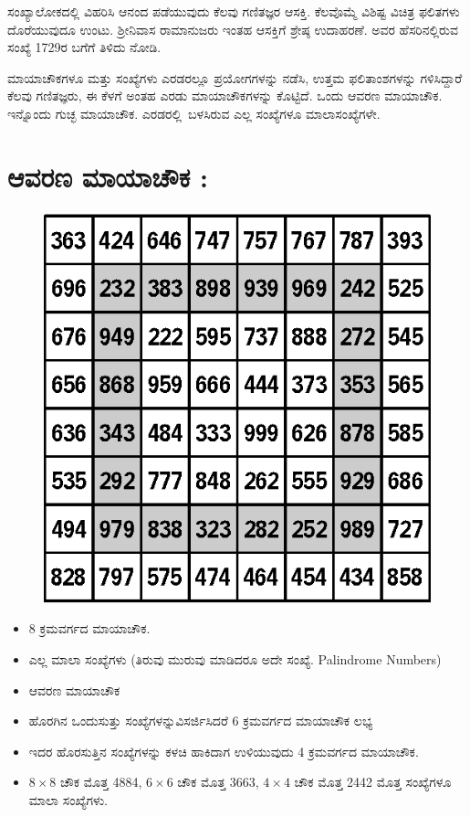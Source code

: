 ಸಂಖ್ಯಾಲೋಕದಲ್ಲಿ ವಿಹರಿಸಿ ಆನಂದ ಪಡೆಯುವುದು ಕೆಲವು ಗಣಿತಜ್ಞರ ಆಸಕ್ತಿ. ಕೆಲವೊಮ್ಮೆ ವಿಶಿಷ್ಟ ವಿಚಿತ್ರ ಫಲಿತಗಳು ದೊರೆಯುವುದೂ ಉಂಟು. ಶ್ರೀನಿವಾಸ ರಾಮಾನುಜರು ಇಂತಹ ಆಸಕ್ತಿಗೆ ಶ್ರೇಷ್ಠ ಉದಾಹರಣೆ. ಅವರ ಹೆಸರಿನಲ್ಲಿರುವ ಸಂಖ್ಯೆ 1729ರ ಬಗೆಗೆ ತಿಳಿದು ನೋಡಿ.

ಮಾಯಾಚೌಕಗಳೂ ಮತ್ತು ಸಂಖ್ಯೆಗಳು ಎರಡರಲ್ಲೂ ಪ್ರಯೋಗಗಳನ್ನು ನಡೆಸಿ, ಉತ್ತಮ ಫಲಿತಾಂಶಗಳನ್ನು ಗಳಿಸಿದ್ದಾರೆ ಕೆಲವು ಗಣಿತಜ್ಞರು, ಈ ಕೆಳಗೆ ಅಂತಹ ಎರಡು ಮಾಯಾಚೌಕ\-ಗಳನ್ನು ಕೊಟ್ಟಿದೆ. ಒಂದು ಆವರಣ ಮಾಯಾಚೌಕ. ಇನ್ನೊಂದು ಗುಚ್ಛ ಮಾಯಾಚೌಕ. \hbox{ಎರಡರಲ್ಲಿ ಬಳಸಿರುವ} ಎಲ್ಲ ಸಂಖ್ಯೆಗಳೂ ಮಾಲಾಸಂಖ್ಯೆಗಳೇ.

\section*{ಆವರಣ ಮಾಯಾಚೌಕ :}

\begin{figure}[H]
\includegraphics{src/figures/chap5/fig5-14.eps}
\end{figure}

\begin{itemize}
	\item 8 ಕ್ರಮವರ್ಗದ ಮಾಯಾಚೌಕ.
	\item ಎಲ್ಲ ಮಾಲಾ ಸಂಖ್ಯೆಗಳು (ತಿರುವು ಮುರುವು ಮಾಡಿದರೂ ಅದೇ ಸಂಖ್ಯೆ. Palindrome Numbers)
	\item ಆವರಣ ಮಾಯಾಚೌಕ
	\item ಹೊರಗಿನ ಒಂದುಸುತ್ತು ಸಂಖ್ಯೆಗಳನ್ನುವಿಸರ್ಜಿಸಿದರೆ 6 ಕ್ರಮವರ್ಗದ ಮಾಯಾಚೌಕ ಲಭ್ಯ
	\item ಇದರ ಹೊರಸುತ್ತಿನ ಸಂಖ್ಯೆಗಳನ್ನು ಕಳಚಿ ಹಾಕಿದಾಗ ಉಳಿಯುವುದು 4 ಕ್ರಮ\-ವರ್ಗದ ಮಾಯಾಚೌಕ.
	\item $8 \times 8$ ಚೌಕ ಮೊತ್ತ 4884, $6 \times 6$ ಚೌಕ ಮೊತ್ತ 3663, $4 \times 4$ ಚೌಕ ಮೊತ್ತ 2442 ಮೊತ್ತ ಸಂಖ್ಯೆಗಳೂ ಮಾಲಾ ಸಂಖ್ಯೆಗಳು.
\end{itemize}

